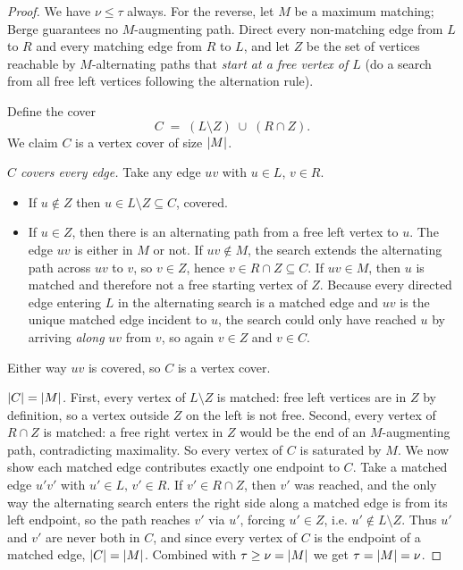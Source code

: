 \begin{proof}
We have $\nu\le\tau$ always. For the reverse, let $M$ be a maximum matching;
Berge guarantees no $M$-augmenting path. Direct every non-matching edge from $L$
to $R$ and every matching edge from $R$ to $L$, and let $Z$ be the set of
vertices reachable by $M$-alternating paths that \emph{start at a free vertex of
$L$} (do a search from all free left vertices following the alternation rule).

Define the cover
\[
C \;=\; (L\setminus Z)\;\cup\;(R\cap Z).
\]
We claim $C$ is a vertex cover of size $\lvert M\rvert$.

\emph{$C$ covers every edge.} Take any edge $uv$ with $u\in L$, $v\in R$.
\begin{itemize}
\item If $u\notin Z$ then $u\in L\setminus Z\subseteq C$, covered.
\item If $u\in Z$, then there is an alternating path from a free left vertex to
$u$. The edge $uv$ is either in $M$ or not. If $uv\notin M$, the search extends
the alternating path across $uv$ to $v$, so $v\in Z$, hence $v\in R\cap Z\subseteq
C$. If $uv\in M$, then $u$ is matched and therefore not a free starting vertex of
$Z$. Because every directed edge entering $L$ in the alternating search is a
matched edge and $uv$ is the unique matched edge incident to $u$, the search
could only have reached $u$ by arriving \emph{along} $uv$ from $v$, so again
$v\in Z$ and $v\in C$.
\end{itemize}
Either way $uv$ is covered, so $C$ is a vertex cover.

\emph{$\lvert C\rvert=\lvert M\rvert$.} First, every vertex of $L\setminus Z$ is matched: free
left vertices are in $Z$ by definition, so a vertex outside $Z$ on the left is
not free. Second, every vertex of $R\cap Z$ is matched: a free right vertex in
$Z$ would be the end of an $M$-augmenting path, contradicting maximality. So
every vertex of $C$ is saturated by $M$. We now show each matched edge
contributes exactly one endpoint to $C$. Take a matched edge $u'v'$ with $u'\in
L,\,v'\in R$. If $v'\in R\cap Z$, then $v'$ was reached, and the only way the
alternating search enters the right side along a matched edge is from its left
endpoint, so the path reaches $v'$ via $u'$, forcing $u'\in Z$, i.e. $u'\notin
L\setminus Z$. Thus $u'$ and $v'$ are never both in $C$, and since every vertex
of $C$ is the endpoint of a matched edge, $\lvert C\rvert=\lvert M\rvert$. Combined with
$\tau\ge\nu=\lvert M\rvert$ we get $\tau=\lvert M\rvert=\nu$.
\end{proof}


